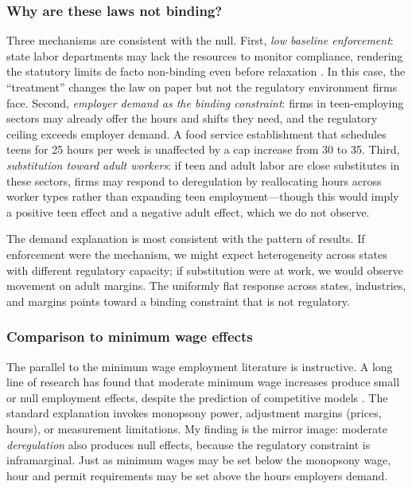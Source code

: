 \documentclass[12pt]{article}
\begin{document}
\subsubsection*{Why are these laws not binding?} Three mechanisms are consistent with the null. First, \textit{low baseline enforcement}: state labor departments may lack the resources to monitor compliance, rendering the statutory limits de facto non-binding even before relaxation \citep{krueger1991economics}. In this case, the ``treatment'' changes the law on paper but not the regulatory environment firms face. Second, \textit{employer demand as the binding constraint}: firms in teen-employing sectors may already offer the hours and shifts they need, and the regulatory ceiling exceeds employer demand. A food service establishment that schedules teens for 25 hours per week is unaffected by a cap increase from 30 to 35. Third, \textit{substitution toward adult workers}: if teen and adult labor are close substitutes in these sectors, firms may respond to deregulation by reallocating hours across worker types rather than expanding teen employment---though this would imply a positive teen effect and a negative adult effect, which we do not observe.

The demand explanation is most consistent with the pattern of results. If enforcement were the mechanism, we might expect heterogeneity across states with different regulatory capacity; if substitution were at work, we would observe movement on adult margins. The uniformly flat response across states, industries, and margins points toward a binding constraint that is not regulatory.

\subsubsection*{Comparison to minimum wage effects} The parallel to the minimum wage employment literature is instructive. A long line of research has found that moderate minimum wage increases produce small or null employment effects, despite the prediction of competitive models \citep{card1992minimum, dube2010minimum, cengiz2019effect, derenoncourt2021minimum}. The standard explanation invokes monopsony power, adjustment margins (prices, hours), or measurement limitations. My finding is the mirror image: moderate \textit{deregulation} also produces null effects, because the regulatory constraint is inframarginal. Just as minimum wages may be set below the monopsony wage, hour and permit requirements may be set above the hours employers demand.
\end{document}
